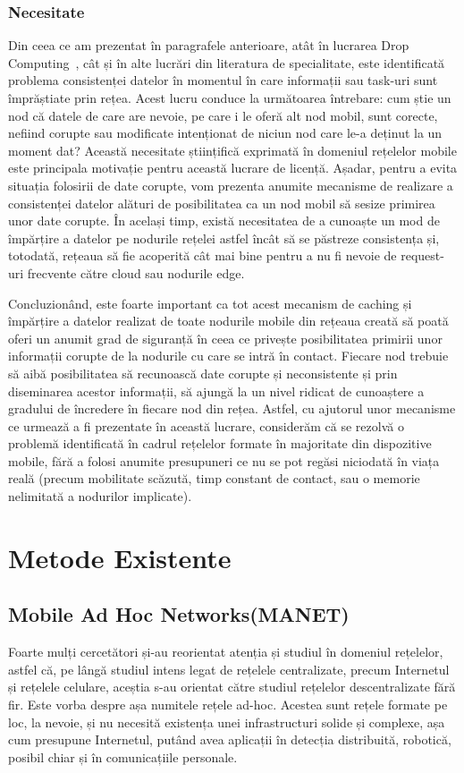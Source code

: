 \documentclass[12pt,a4paper]{report}
\begin{document}
\subsection{Necesitate}
Din ceea ce am prezentat în paragrafele anterioare, atât în lucrarea Drop Computing~\cite{DC}, cât și în alte lucrări din literatura de specialitate, este identificată problema consistenței datelor în momentul în care informații sau task-uri sunt împrăștiate prin rețea. Acest lucru conduce la următoarea întrebare: cum știe un nod că datele de care are nevoie, pe care i le oferă alt nod mobil, sunt corecte, nefiind corupte sau modificate intenționat de niciun nod care le-a deținut la un moment dat? Această necesitate științifică exprimată în domeniul rețelelor mobile este principala motivație pentru această lucrare de licență. Așadar, pentru a evita situația folosirii de date corupte, vom prezenta anumite mecanisme de realizare a consistenței datelor alături de posibilitatea ca un nod mobil să sesize primirea unor date corupte. În același timp, există necesitatea de a cunoaște un mod de împărțire a datelor pe nodurile rețelei astfel încât să se păstreze consistența și, totodată, rețeaua să fie acoperită cât mai bine pentru a nu fi nevoie de request-uri frecvente către cloud sau nodurile edge.

Concluzionând, este foarte important ca tot acest mecanism de caching și împărțire a datelor realizat de toate nodurile mobile din rețeaua creată să poată oferi un anumit grad de siguranță în ceea ce privește posibilitatea primirii unor informații corupte de la nodurile cu care se intră în contact. Fiecare nod trebuie să aibă posibilitatea să recunoască date corupte și neconsistente și prin diseminarea acestor informații, să ajungă la un nivel ridicat de cunoaștere a gradului de încredere în fiecare nod din rețea. Astfel, cu ajutorul unor mecanisme ce urmează a fi prezentate în această lucrare, considerăm că se rezolvă o problemă identificată în cadrul rețelelor formate în majoritate din dispozitive mobile, fără a folosi anumite presupuneri ce nu se pot regăsi niciodată în viața reală (precum mobilitate scăzută, timp constant de contact, sau o memorie nelimitată a nodurilor implicate).

\chapter{Metode Existente} \label{metodeExistente}
\section{Mobile Ad Hoc Networks(MANET)}
Foarte mulți cercetători și-au reorientat atenția și studiul în domeniul rețelelor, astfel că, pe lângă studiul intens legat de rețelele centralizate, precum Internetul și rețelele celulare, aceștia s-au orientat către studiul rețelelor descentralizate fără fir. Este vorba despre așa numitele rețele ad-hoc\cite{MITArticle}. Acestea sunt rețele formate pe loc, la nevoie, și nu necesită existența unei infrastructuri solide și complexe, așa cum presupune Internetul, putând avea aplicații în detecția distribuită, robotică, posibil chiar și în comunicațiile personale.
\end{document}
